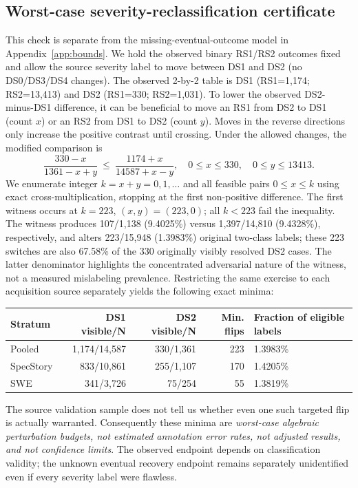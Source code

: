 \subsection{Worst-case severity-reclassification certificate}\label{app:relabel}
This check is separate from the missing-eventual-outcome model in Appendix~\ref{app:bounds}. We hold the observed binary RS1/RS2 outcomes fixed and allow the source severity label to move between DS1 and DS2 (no DS0/DS3/DS4 changes). The observed 2-by-2 table is DS1 (RS1=1,174; RS2=13,413) and DS2 (RS1=330; RS2=1,031). To lower the observed DS2-minus-DS1 difference, it can be beneficial to move an RS1 from DS2 to DS1 (count $x$) or an RS2 from DS1 to DS2 (count $y$). Moves in the reverse directions only increase the positive contrast until crossing. Under the allowed changes, the modified comparison is
\[
\frac{330-x}{1361-x+y}\ \leq\ \frac{1174+x}{14587+x-y},\quad 0\leq x\leq330,\quad 0\leq y\leq13413.
\]
We enumerate integer $k=x+y=0,1,\ldots$ and all feasible pairs $0\leq x\leq k$ using exact cross-multiplication, stopping at the first non-positive difference. The first witness occurs at $k=223$, $(x,y)=(223,0)$; all $k<223$ fail the inequality. The witness produces 107/1,138 (9.4025\%) versus 1,397/14,810 (9.4328\%), respectively, and alters 223/15,948 (1.3983\%) original two-class labels; these 223 switches are also 67.58\% of the 330 originally visibly resolved DS2 cases. The latter denominator highlights the concentrated adversarial nature of the witness, not a measured mislabeling prevalence. Restricting the same exercise to each acquisition source separately yields the following exact minima:
\begin{center}
\begin{tabularx}{\linewidth}{@{}lrrrY@{}}
\toprule Stratum & DS1 visible/N & DS2 visible/N & Min. flips & Fraction of eligible labels\\\midrule
Pooled & 1,174/14,587 & 330/1,361 & 223 & 1.3983\%\\
SpecStory & 833/10,861 & 255/1,107 & 170 & 1.4205\%\\
SWE & 341/3,726 & 75/254 & 55 & 1.3819\%\\\bottomrule
\end{tabularx}
\end{center}
The source validation sample does not tell us whether even one such targeted flip is actually warranted. Consequently these minima are \emph{worst-case algebraic perturbation budgets, not estimated annotation error rates, not adjusted results, and not confidence limits}. The observed endpoint depends on classification validity; the unknown eventual recovery endpoint remains separately unidentified even if every severity label were flawless.

